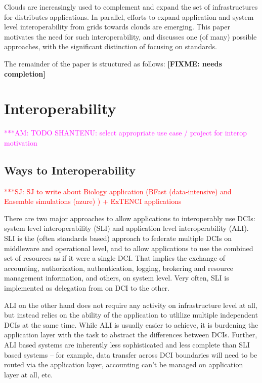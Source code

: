 \documentclass[10pt,conference,final,letterpaper,twoside,twocolumn,]{IEEEtran}
\newcommand{\amnote}[1]{  {\textcolor{magenta} {***AM: #1}}}
\newcommand{\jhanote}[1]{ {\textcolor{red}     {***SJ: #1}}}
\newcommand{\amnote}[1]{}
\newcommand{\jhanote}[1]{}
\newcommand{\B}[1]{\textbf{#1}}
\newcommand{\F}[1]{\B{[FIXME: #1]}}
\begin{document}
 Clouds are increasingly used to complement and expand the set of
 infrastructures for distributes applications.  In parallel, efforts
 to expand application and system level interoperability from grids
 towards clouds are emerging.  This paper motivates the need for such
 interoperability, and discusses one (of many) possible approaches,
 with the significant distinction of focusing on standards.

 The remainder of the paper is structured as follows: \F{needs
 completion}


\section{Interoperability}
\label{sec:interop}

 \amnote{TODO SHANTENU: select appropriate use case / project for
 interop motivation}

 \subsection*{Ways to Interoperability}
 
 \jhanote{SJ to write about Biology application (BFast (data-intensive)
  and Ensemble simulations (azure) ) + ExTENCI applications}

 There are two major approaches to allow applications to interoperably
 use DCIs: system level interoperability (SLI) and application level
 interoperability (ALI).  SLI is the (often standards based) approach
 to federate multiple DCIs on middleware and operational level, and to
 allow applications to use the combined set of resources as if it were
 a single DCI.  That implies the exchange of accounting,
 authorization, authentication, logging, brokering and resource
 management information, and others, on system level.  Very often, SLI
 is implemented as delegation from on DCI to the other.

 ALI on the other hand does not require any activity on infrastructure
 level at all, but instead relies on the ability of the application to
 utlilize multiple independent DCIs at the same time.  While ALI is
 usually easier to achieve, it is burdening the application layer
 with the task to abstract the differences between DCIs.  Further, ALI
 based systems are inherently less sophisticated and less complete
 than SLI based systems -- for example, data transfer across DCI
 boundaries will need to be routed via the application layer,
 accounting can't be managed on application layer at all, etc.
\end{document}
